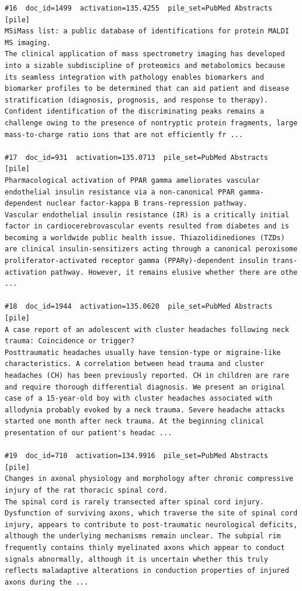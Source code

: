 \begin{verbatim}
#16  doc_id=1499  activation=135.4255  pile_set=PubMed Abstracts  [pile]
MSiMass list: a public database of identifications for protein MALDI MS imaging.
The clinical application of mass spectrometry imaging has developed into a sizable subdiscipline of proteomics and metabolomics because its seamless integration with pathology enables biomarkers and biomarker profiles to be determined that can aid patient and disease stratification (diagnosis, prognosis, and response to therapy). Confident identification of the discriminating peaks remains a challenge owing to the presence of nontryptic protein fragments, large mass-to-charge ratio ions that are not efficiently fr ...

#17  doc_id=931  activation=135.0713  pile_set=PubMed Abstracts  [pile]
Pharmacological activation of PPAR gamma ameliorates vascular endothelial insulin resistance via a non-canonical PPAR gamma-dependent nuclear factor-kappa B trans-repression pathway.
Vascular endothelial insulin resistance (IR) is a critically initial factor in cardiocerebrovascular events resulted from diabetes and is becoming a worldwide public health issue. Thiazolidinediones (TZDs) are clinical insulin-sensitizers acting through a canonical peroxisome proliferator-activated receptor gamma (PPARγ)-dependent insulin trans-activation pathway. However, it remains elusive whether there are othe ...

#18  doc_id=1944  activation=135.0620  pile_set=PubMed Abstracts  [pile]
A case report of an adolescent with cluster headaches following neck trauma: Coincidence or trigger?
Posttraumatic headaches usually have tension-type or migraine-like characteristics. A correlation between head trauma and cluster headaches (CH) has been previously reported. CH in children are rare and require thorough differential diagnosis. We present an original case of a 15-year-old boy with cluster headaches associated with allodynia probably evoked by a neck trauma. Severe headache attacks started one month after neck trauma. At the beginning clinical presentation of our patient's headac ...

#19  doc_id=710  activation=134.9916  pile_set=PubMed Abstracts  [pile]
Changes in axonal physiology and morphology after chronic compressive injury of the rat thoracic spinal cord.
The spinal cord is rarely transected after spinal cord injury. Dysfunction of surviving axons, which traverse the site of spinal cord injury, appears to contribute to post-traumatic neurological deficits, although the underlying mechanisms remain unclear. The subpial rim frequently contains thinly myelinated axons which appear to conduct signals abnormally, although it is uncertain whether this truly reflects maladaptive alterations in conduction properties of injured axons during the ...


\end{verbatim}
